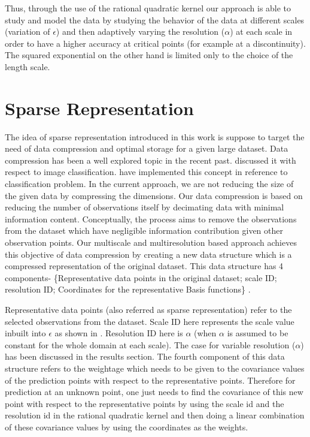 \documentclass[procedia]{easychair}
\begin{document}
Thus, through the use of the rational quadratic kernel our approach is able to study and model the data by studying the behavior of the data at different scales (variation of $\epsilon$) and then adaptively varying the resolution ($\alpha$) at each scale in order to have a higher accuracy at critical points (for example at a discontinuity). The squared exponential on the other hand is limited only to the choice of the length scale.

\section{Sparse Representation}
\label{sect:sparse}

The idea of sparse representation introduced in this work is suppose to target the need of data compression and optimal storage for a given large dataset. Data compression has been a well explored topic in the recent past. \cite{liu2014self} discussed it with respect to image classification. \cite{yang2011learning} have implemented this concept in reference to classification problem. In the current approach, we are not reducing the size of the given data by compressing the dimensions. Our data compression is based on reducing the number of observations itself by decimating data with minimal information content. Conceptually, the process aims to remove the observations from the dataset which have negligible information contribution given other observation points. Our multiscale and multiresolution based approach achieves this objective of data compression by creating a new data structure which is a compressed representation of the original dataset. This data structure has 4 components- \{Representative data points in the original dataset; scale ID; resolution ID; Coordinates for the representative Basis functions\} .

Representative data points (also referred as  sparse representation) refer to the selected observations from the dataset. Scale ID here represents the scale value inbuilt into $\epsilon$ as shown in \cite{patra2016multilevel}. Resolution ID here is $\alpha$ (when $\alpha$ is assumed to be constant for the whole domain at each scale). The case for variable resolution ($\alpha$) has been discussed in the results section. The fourth component of this data structure refers to the weightage which needs to be given to the covariance values of the prediction points with respect to the representative points. Therefore for prediction at an unknown point, one just needs to find the covariance of this new point with respect to the representative points by using the scale id and the resolution id in the rational quadratic kernel and then doing a linear combination of these covariance values by using the coordinates as the weights.
\end{document}
